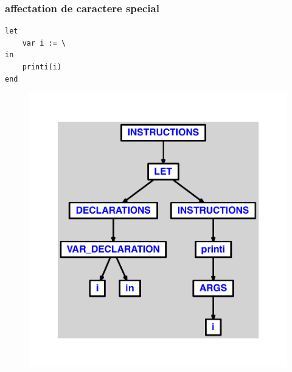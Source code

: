 \documentclass{article}
\begin{document}
\subsubsection{affectation de caractere special}
\begin{lstlisting}
let
	var i := \
in
	printi(i)
end
\end{lstlisting}
\newpage
\begin{figure}[H]
\centering
\includegraphics[max width=\textwidth]{ast/ast_298.pdf}
\end{figure}
\newpage
\end{document}
